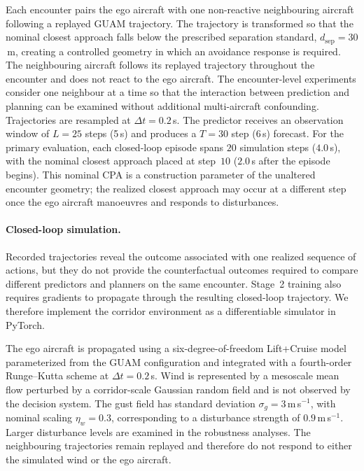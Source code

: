 \documentclass[11pt]{article}
\theoremstyle{plain}
\theoremstyle{definition}
\begin{document}
Each encounter pairs the ego aircraft with one non-reactive
neighbouring aircraft following a replayed GUAM trajectory. The
trajectory is transformed so that the nominal closest approach falls
below the prescribed separation standard,
$d_{\mathrm{sep}}=30$\,m, creating a controlled geometry in which an
avoidance response is required. The neighbouring aircraft follows its
replayed trajectory throughout the encounter and does not react to
the ego aircraft. The encounter-level experiments consider one
neighbour at a time so that the interaction between prediction and
planning can be examined without additional multi-aircraft
confounding. Trajectories are resampled at $\Delta t=0.2$\,s. The
predictor receives an observation window of $L=25$ steps (5\,s) and
produces a $T=30$ step (6\,s) forecast. For the primary evaluation, each closed-loop episode spans
$20$ simulation steps ($4.0$\,s), with the nominal closest approach
placed at step~$10$ ($2.0$\,s after the episode begins). This nominal
CPA is a construction parameter of the unaltered encounter geometry;
the realized closest approach may occur at a different step once the
ego aircraft manoeuvres and responds to disturbances.

\paragraph{Closed-loop simulation.}
Recorded trajectories reveal the outcome associated with one realized
sequence of actions, but they do not provide the counterfactual
outcomes required to compare different predictors and planners on the
same encounter. Stage~2 training also requires gradients to propagate
through the resulting closed-loop trajectory. We therefore implement
the corridor environment as a differentiable simulator in PyTorch.

The ego aircraft is propagated using a six-degree-of-freedom
Lift+Cruise model parameterized from the GUAM configuration and
integrated with a fourth-order Runge--Kutta scheme at
$\Delta t=0.2$\,s. Wind is represented by a mesoscale mean flow
perturbed by a corridor-scale Gaussian random field and is not
observed by the decision system. The gust field has standard
deviation $\sigma_g=3$\,m\,s$^{-1}$, with nominal scaling
$\eta_w=0.3$, corresponding to a disturbance strength of
$0.9$\,m\,s$^{-1}$. Larger disturbance levels are examined in the
robustness analyses. The neighbouring trajectories remain replayed
and therefore do not respond to either the simulated wind or the ego
aircraft.
\end{document}
